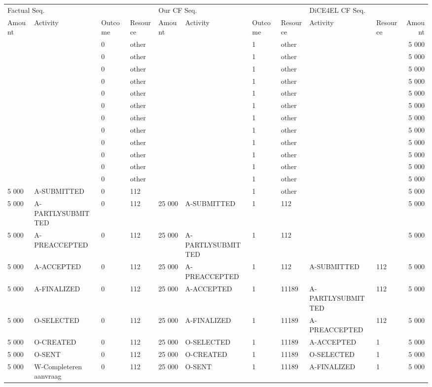 \begin{tabular}{llllllllllr}
\toprule
\multicolumn{4}{l}{Factual Seq.} & \multicolumn{4}{l}{Our CF Seq.} & \multicolumn{3}{l}{DiCE4EL CF Seq.} \\
Amount & Activity & Outcome & Resource & Amount & Activity & Outcome & Resource & Activity & Resource & Amount \\
\midrule
 &  & 0 & other &  &  & 1 & other &  &  & 5 000 \\
 &  & 0 & other &  &  & 1 & other &  &  & 5 000 \\
 &  & 0 & other &  &  & 1 & other &  &  & 5 000 \\
 &  & 0 & other &  &  & 1 & other &  &  & 5 000 \\
 &  & 0 & other &  &  & 1 & other &  &  & 5 000 \\
 &  & 0 & other &  &  & 1 & other &  &  & 5 000 \\
 &  & 0 & other &  &  & 1 & other &  &  & 5 000 \\
 &  & 0 & other &  &  & 1 & other &  &  & 5 000 \\
 &  & 0 & other &  &  & 1 & other &  &  & 5 000 \\
 &  & 0 & other &  &  & 1 & other &  &  & 5 000 \\
 &  & 0 & other &  &  & 1 & other &  &  & 5 000 \\
 &  & 0 & other &  &  & 1 & other &  &  & 5 000 \\
5 000 & A-SUBMITTED & 0 & 112 &  &  & 1 & other &  &  & 5 000 \\
5 000 & A-PARTLYSUBMITTED & 0 & 112 & 25 000 & A-SUBMITTED & 1 & 112 &  &  & 5 000 \\
5 000 & A-PREACCEPTED & 0 & 112 & 25 000 & A-PARTLYSUBMITTED & 1 & 112 &  &  & 5 000 \\
5 000 & A-ACCEPTED & 0 & 112 & 25 000 & A-PREACCEPTED & 1 & 112 & A-SUBMITTED & 112 & 5 000 \\
5 000 & A-FINALIZED & 0 & 112 & 25 000 & A-ACCEPTED & 1 & 11189 & A-PARTLYSUBMITTED & 112 & 5 000 \\
5 000 & O-SELECTED & 0 & 112 & 25 000 & A-FINALIZED & 1 & 11189 & A-PREACCEPTED & 112 & 5 000 \\
5 000 & O-CREATED & 0 & 112 & 25 000 & O-SELECTED & 1 & 11189 & A-ACCEPTED & 1 & 5 000 \\
5 000 & O-SENT & 0 & 112 & 25 000 & O-CREATED & 1 & 11189 & O-SELECTED & 1 & 5 000 \\
5 000 & W-Completeren aanvraag & 0 & 112 & 25 000 & O-SENT & 1 & 11189 & A-FINALIZED & 1 & 5 000 \\

\end{tabular}
